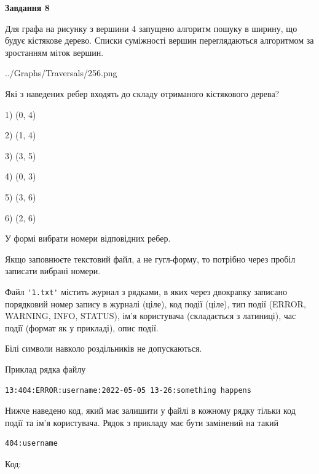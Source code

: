 \documentclass[12pt, ukrainian]{article}
\def\code#1{\Verb!#1!}
\begin{document}
{\begin {large}
{\begin {center}\textbf{Завдання 8}\end {center}}\par
Для графа на рисунку з вершини 4 запущено алгоритм пошуку в ширину, що будує кістякове дерево. Списки суміжності вершин переглядаються алгоритмом за зростанням міток вершин.\par
\begin{center}
	{../Graphs/Traversals/256.png}
\end{center}
\par Які з наведених ребер входять до складу отриманого кістякового дерева?\par
1) (0, 4)\par
2) (1, 4)\par
3) (3, 5)\par
4) (0, 3)\par
5) (3, 6)\par
6) (2, 6)\par
{\vskip 15pt} У формі вибрати номери відповідних ребер.


Якщо заповнюєте текстовий файл, а не гугл-форму, то потрібно через пробіл записа\-ти вибрані номери.\par
\newpage


Файл \code{'1.txt'} містить журнал з рядками, в яких через двокрапку записано поряд\-ко\-вий номер запису в журналі (ціле), код події (ціле), тип події (ERROR, \\WARNING, INFO, STATUS), ім'я користувача (складається з латиниці), час події (фор\-мат як у прикладі), опис події.

Білі символи навколо роздільників не допускаються.

Приклад рядка файлу



\begin{verbatim}
13:404:ERROR:username:2022-05-05 13-26:something happens
\end{verbatim}


Нижче наведено код, який має залишити у файлі в кожному рядку тільки код події та ім'я користувача. Рядок з прикладу має бути замінений на такий



\begin{verbatim}
404:username
\end{verbatim}




Код:




\end{large}}
\end{document}
